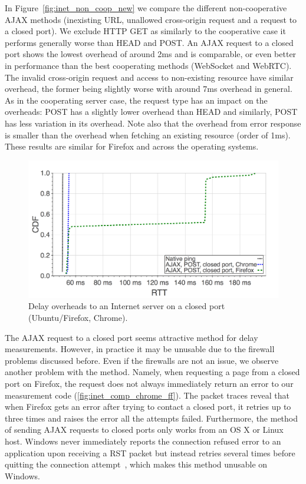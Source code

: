\documentclass{sig-alternate-10pt}
\begin{document}
In Figure~\ref{fig:inet_non_coop_new} we compare the different non-cooperative AJAX methods (inexisting URL, unallowed cross-origin request and a request to a closed port). We exclude HTTP GET as similarly to the cooperative case it performs generally worse than HEAD and POST. An AJAX request to a closed port shows the lowest overhead of around 2ms and is comparable, or even better in performance than the best cooperating methods (WebSocket and WebRTC). The invalid cross-origin request and access to non-existing resource have similar overhead, the former being slightly worse with around 7ms overhead in general. As in the cooperating server case, the request type has an impact on the overheads: POST has a slightly lower overhead than HEAD and similarly, POST has less variation in its overhead. Note also that the overhead from error response is smaller than the overhead when fetching an existing resource (order of 1ms). These results are similar for Firefox and across the operating systems.

\begin{figure}[h]
\includegraphics[width=\columnwidth]{figures/inet-comp-chrome-ff}
\caption{Delay overheads to an Internet server on a closed port (Ubuntu/Firefox, Chrome).}
\label{fig:inet_comp_chrome_ff}
\end{figure}

The AJAX request to a closed port seems attractive method for delay measurements. However, in practice it may be unusable due to the firewall problems discussed before. Even if the firewalls are not an issue, we observe another problem with the method. Namely, when requesting a page from a closed port on Firefox, the request does not always immediately return an error to our measurement code (\autoref{fig:inet_comp_chrome_ff}). The packet traces reveal that when Firefox gets an error after trying to contact a closed port, it retries up to three times and raises the error all the attempts failed. Furthermore, the method of sending AJAX requests to closed ports only works from an OS X or Linux host. Windows never immediately reports the connection refused error to an application upon receiving a RST packet but instead retries several times before quitting the connection attempt~\cite{r._jesup_info:_2011}, which makes this method unusable on Windows. 
\end{document}
